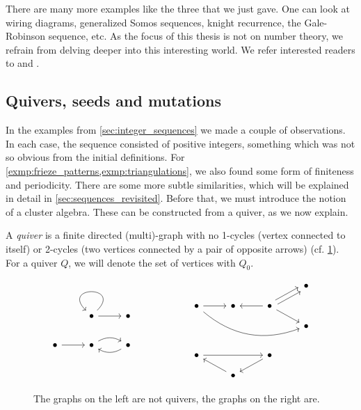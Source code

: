 There are many more examples like the three that we just gave. One can look at wiring
diagrams, generalized Somos sequences, knight recurrence, the Gale-Robinson sequence,
etc. As the focus of this thesis is not on number theory, we refrain from delving
deeper into this interesting world. We refer interested readers to \cite[Chapter
	3.4]{FominWilliams2021IntroductionCA_1-3} and \cite{FominZelevinsky2002Laurent}.

\subsection{Quivers, seeds and mutations}\label{sec:quivers_seeds_mutations}

In the examples from \cref{sec:integer_sequences} we made a couple of observations. In
each case, the sequence consisted of positive integers, something which was not so
obvious from the initial definitions. For
\cref{exmp:frieze_patterns,exmp:triangulations}, we also found some form of finiteness
and periodicity. There are some more subtle similarities, which will be explained in
detail in \cref{sec:sequences_revisited}. Before that, we must introduce the notion of
a cluster algebra. These can be constructed from a quiver, as we now explain.

\begin{definition}[Quivers]

	A \emph{quiver} is a finite directed (multi)-graph with no 1-cycles
	(vertex connected to itself) or 2-cycles (two vertices connected by a pair of opposite
	arrows) (cf. \cref{fig:quivers}). For a quiver $Q$, we will denote the set of vertices
	with $Q_0$.
\end{definition}

\begin{figure}[ht!]
	\centering
	\begin{equation*}
		\begin{tikzcd}
			&\bullet \arrow[loop] \arrow[r] &\bullet \\
			\bullet \rar & \bullet \arrow[r, bend left] & \bullet \arrow[l, bend left]
		\end{tikzcd}
		\hspace{2cm}
		\begin{tikzcd}[row sep=small]
			&&& \bullet \\
			\bullet \ar[rrrd, bend right]\rar &\bullet  \rar[leftarrow] &\bullet \ar[ru, shift left] \ar[ru, shift right] \ar[rd] \\
			&&& \bullet\\
			\\
			\bullet \ar[rr] && \bullet \ar[ld]\\
			& \bullet \ar[lu]
		\end{tikzcd}
	\end{equation*}
	\caption{The graphs on the left are not quivers, the graphs on the right are.}
	\label{fig:quivers}
\end{figure}

